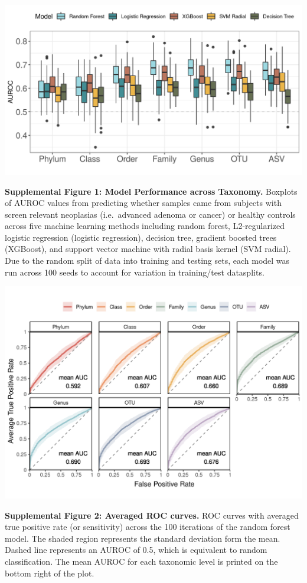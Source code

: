 \documentclass[
]{article}
\begin{document}
\includegraphics{figure_s1.png}

\textbf{Supplemental Figure 1: Model Performance across Taxonomy.}
Boxplots of AUROC values from predicting whether samples came from
subjects with screen relevant neoplasias (i.e.~advanced adenoma or
cancer) or healthy controls across five machine learning methods
including random forest, L2-regularized logistic regression (logistic
regression), decision tree, gradient boosted trees (XGBoost), and
support vector machine with radial basis kernel (SVM radial). Due to the
random split of data into training and testing sets, each model was run
across 100 seeds to account for variation in training/test datasplits.

\newpage

\includegraphics[width=\textwidth,height=0.5\textheight]{figure_s2.png}

\textbf{Supplemental Figure 2: Averaged ROC curves.} ROC curves with
averaged true positive rate (or sensitivity) across the 100 iterations
of the random forest model. The shaded region represents the standard
deviation form the mean. Dashed line represents an AUROC of 0.5, which
is equivalent to random classification. The mean AUROC for each
taxonomic level is printed on the bottom right of the plot.
\end{document}

